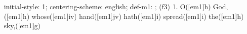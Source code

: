 initial-style: 1;
centering-scheme: english;
def-m1: \grealign;
(f3) 1. O([em1]h) God,([em1]h) whose([em1]iv) hand([em1]jv) hath([em1]i) spread([em1]i) the([em1]h) sky,([em1]g)
